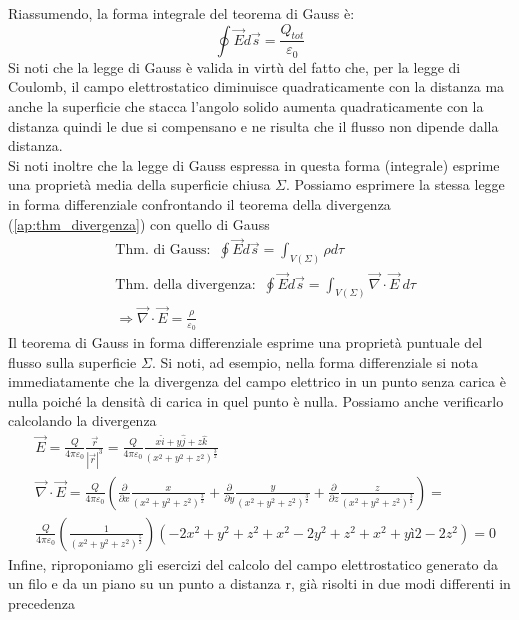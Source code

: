 \documentclass[10pt,a4paper]{article}
\begin{document}
Riassumendo, la forma integrale del teorema di Gauss è:
\[\oint\vec{E}d\vec{s} = \frac{Q_{tot}}{\varepsilon_0}\]
Si noti che la legge di Gauss è valida in virtù del fatto che, per la legge di Coulomb, il campo elettrostatico diminuisce quadraticamente con la distanza ma anche la superficie che stacca l'angolo solido aumenta quadraticamente con la distanza quindi le due si compensano e ne risulta che il flusso non dipende dalla distanza.\\
Si noti inoltre che la legge di Gauss espressa in questa forma (integrale) esprime una proprietà media della superficie chiusa $\Sigma$. Possiamo esprimere la stessa legge in forma differenziale confrontando il teorema della divergenza (\ref{ap:thm_divergenza}) con quello di Gauss
\begin{align*}
	&\text{Thm. di Gauss: }\ \oint\vec{E}d\vec{s} = \int_{V(\Sigma)}\rho d\tau\\
	&\text{Thm. della divergenza: }\ \oint\vec{E}d\vec{s} = \int_{V(\Sigma)}\vec{\nabla}\cdot\vec{E}\ d\tau \\
	&\Rightarrow \vec{\nabla}\cdot\vec{E} = \frac{\rho}{\varepsilon_0}
\end{align*} 
Il teorema di Gauss in forma differenziale esprime una proprietà puntuale del flusso sulla superficie $\Sigma$. Si noti, ad esempio, nella forma differenziale si nota immediatamente che la divergenza del campo elettrico in un punto senza carica è nulla poiché la densità di carica in quel punto è nulla. Possiamo anche verificarlo calcolando la divergenza
\begin{align*}
	&\vec{E} = \frac{Q}{4\pi\varepsilon_0}\frac{\vec{r}}{|\vec{r}|^3} = \frac{Q}{4\pi\varepsilon_0}\frac{x\hat{i}+y\hat{j}+z\hat{k}}{(x^2+y^2+z^2)^{\frac{3}{2}}}\\
	&\vec{\nabla}\cdot\vec{E} = \frac{Q}{4\pi\varepsilon_0}\left(\frac{\partial}{\partial x}\frac{x}{(x^2+y^2+z^2)^{\frac{3}{2}}}+\frac{\partial}{\partial y}\frac{y}{(x^2+y^2+z^2)^{\frac{3}{2}}}+\frac{\partial}{\partial z}\frac{z}{(x^2+y^2+z^2)^{\frac{3}{2}}}\right)=\\
	& \frac{Q}{4\pi\varepsilon_0}\left(\frac{1}{(x^2+y^2+z^2)^{\frac{5}{2}}}\right)(-2x^2+y^2+z^2+x^2-2y^2+z^2+x^2+yì2-2z^2) = 0
\end{align*}
Infine, riproponiamo gli esercizi del calcolo del campo elettrostatico generato da un filo e da un piano su un punto a distanza r, già risolti in due modi differenti in precedenza
\end{document}
